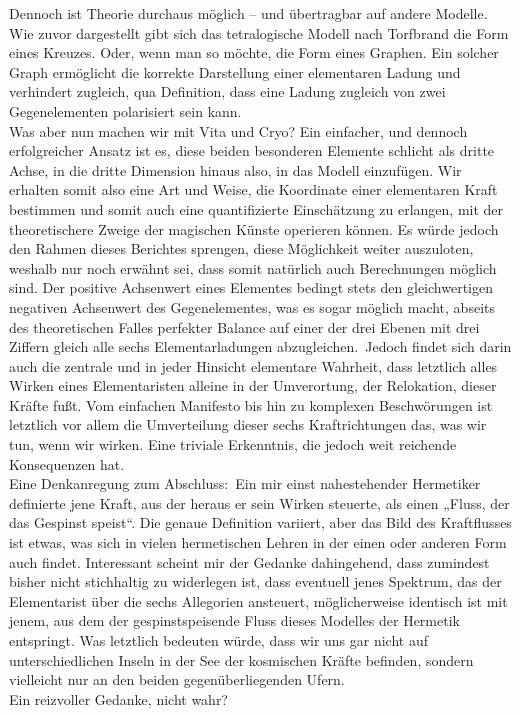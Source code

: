 \documentclass[a5paper,8pt]{book}
\begin{document}
Dennoch ist Theorie durchaus möglich – und übertragbar auf andere Modelle. Wie zuvor dargestellt gibt sich das tetralogische Modell nach Torfbrand die Form eines Kreuzes. Oder, 
wenn man so möchte, die Form eines Graphen. Ein solcher Graph ermöglicht die korrekte Darstellung einer elementaren Ladung und verhindert zugleich, qua Definition, dass eine 
Ladung zugleich von zwei Gegenelementen polarisiert sein kann.\\
Was aber nun machen wir mit Vita und Cryo? Ein einfacher, und dennoch erfolgreicher Ansatz ist es, diese beiden besonderen Elemente schlicht als dritte Achse, in die dritte 
Dimension hinaus also, in das Modell einzufügen. Wir erhalten somit also eine Art und Weise, die Koordinate einer elementaren Kraft bestimmen und somit auch eine quantifizierte 
Einschätzung zu erlangen, mit der theoretischere Zweige der magischen Künste operieren können.
Es würde jedoch den Rahmen dieses Berichtes sprengen, diese Möglichkeit weiter auszuloten, weshalb nur noch erwähnt sei, dass somit natürlich auch Berechnungen möglich sind. 
Der positive Achsenwert eines Elementes bedingt stets den gleichwertigen negativen Achsenwert des Gegenelementes, was es sogar möglich macht, abseits des theoretischen Falles 
perfekter Balance auf einer der drei Ebenen mit drei Ziffern gleich alle sechs Elementarladungen abzugleichen.\
Jedoch findet sich darin auch die zentrale und in jeder Hinsicht elementare Wahrheit, dass letztlich alles Wirken eines Elementaristen alleine in der Umverortung, der Relokation, 
dieser Kräfte fußt. Vom einfachen Manifesto bis hin zu komplexen Beschwörungen ist letztlich vor allem die Umverteilung dieser sechs Kraftrichtungen das, was wir tun, wenn wir 
wirken.
Eine triviale Erkenntnis, die jedoch weit reichende Konsequenzen hat.\\

Eine Denkanregung zum Abschluss:\
Ein mir einst nahestehender Hermetiker definierte jene Kraft, aus der heraus er sein Wirken steuerte, als einen „Fluss, der das Gespinst speist“. Die genaue Definition variiert, 
aber das Bild des Kraftflusses ist etwas, was sich in vielen hermetischen Lehren in der einen oder anderen Form auch findet.
Interessant scheint mir der Gedanke dahingehend, dass zumindest bisher nicht stichhaltig zu widerlegen ist, dass eventuell jenes Spektrum, das der Elementarist über die sechs 
Allegorien ansteuert, möglicherweise identisch ist mit jenem, aus dem der gespinstspeisende Fluss dieses Modelles der Hermetik entspringt.
Was letztlich bedeuten würde, dass wir uns gar nicht auf unterschiedlichen Inseln in der See der kosmischen Kräfte befinden, sondern vielleicht nur an den beiden 
gegenüberliegenden Ufern.\\
Ein reizvoller Gedanke, nicht wahr?
\end{document}
